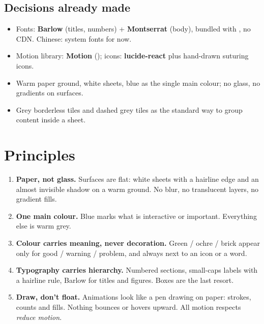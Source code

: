 \documentclass[10pt,a4paper]{article}
\newcommand{\code}[1]{\leavevmode{\ttfamily\small\color{brandeight}#1}}
\begin{document}
\subsection{Decisions already made}

\begin{itemize}
  \item Fonts: \textbf{Barlow} (titles, numbers) + \textbf{Montserrat} (body), bundled with \code{@fontsource}, no CDN. Chinese: system fonts for now.
  \item Motion library: \textbf{Motion} (\code{motion/react}); icons: \textbf{lucide-react} plus hand-drawn suturing icons.
  \item Warm paper ground, white sheets, blue as the single main colour; no glass, no gradients on surfaces.
  \item Grey borderless tiles and dashed grey tiles as the standard way to group content inside a sheet.
\end{itemize}

\section{Principles}

\begin{enumerate}[leftmargin=1.4em, itemsep=0.5em]
  \item \textbf{Paper, not glass.} Surfaces are flat: white sheets with a hairline edge and an almost
        invisible shadow on a warm ground. No blur, no translucent layers, no gradient fills.
  \item \textbf{One main colour.} Blue marks what is interactive or important. Everything else is warm grey.
  \item \textbf{Colour carries meaning, never decoration.} Green / ochre / brick appear only for good /
        warning / problem, and always next to an icon or a word.
  \item \textbf{Typography carries hierarchy.} Numbered sections, small-caps labels with a hairline rule,
        Barlow for titles and figures. Boxes are the last resort.
  \item \textbf{Draw, don't float.} Animations look like a pen drawing on paper: strokes, counts and
        fills. Nothing bounces or hovers upward. All motion respects \emph{reduce motion}.
\end{enumerate}
\end{document}

